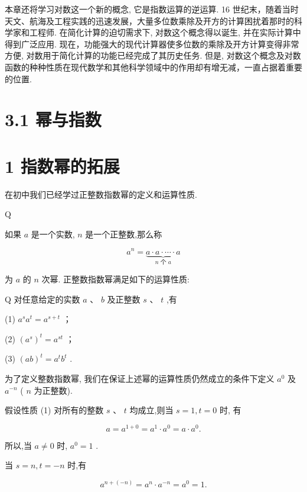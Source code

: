 \documentclass[10pt]{article}
\begin{document}
本章还将学习对数这一个新的概念, 它是指数运算的逆运算. 16 世纪末，随着当时天文、航海及工程实践的迅速发展，大量多位数乘除及开方的计算困扰着那时的科学家和工程师. 在简化计算的迫切需求下, 对数这个概念得以诞生, 并在实际计算中得到广泛应用. 现在，功能强大的现代计算器使多位数的乘除及开方计算变得非常方便, 对数用于简化计算的功能已经完成了其历史任务. 但是, 对数这个概念及对数函数的种种性质在现代数学和其他科学领域中的作用却有增无减，一直占据着重要的位置.

\section*{}

\section*{3.1 幂与指数}

\section*{1 指数幂的拓展}

在初中我们已经学过正整数指数幂的定义和运算性质.

Q

如果 \(a\) 是一个实数, \(n\) 是一个正整数,那么称

\[
{a}^{n} = \underset{n\text{ 个 }a}{\underbrace{a \cdot  a \cdot  \cdots  \cdot  a}}
\]

为 \(a\) 的 \(n\) 次幂. 正整数指数幂满足如下的运算性质:

Q 对任意给定的实数 \(a\text{ 、 }b\) 及正整数 \(s\text{ 、 }t\) ,有

(1) \({a}^{s}{a}^{t} = {a}^{s + t}\) ；

(2) \({\left( {a}^{s}\right) }^{t} = {a}^{st}\) ；

(3) \({\left( ab\right) }^{t} = {a}^{t}{b}^{t}\) .

为了定义整数指数幂, 我们在保证上述幂的运算性质仍然成立的条件下定义 \({a}^{0}\) 及 \({a}^{-n}\) ( \(n\) 为正整数).

假设性质 (1) 对所有的整数 \(s\text{ 、 }t\) 均成立,则当 \(s = 1,t = 0\) 时, 有

\[
a = {a}^{1 + 0} = {a}^{1} \cdot  {a}^{0} = a \cdot  {a}^{0}.
\]

所以,当 \(a \neq  0\) 时, \({a}^{0} = 1\) .

当 \(s = n,t =  - n\) 时,有

\[
{a}^{n + \left( {-n}\right) } = {a}^{n} \cdot  {a}^{-n} = {a}^{0} = 1.
\]
\end{document}
